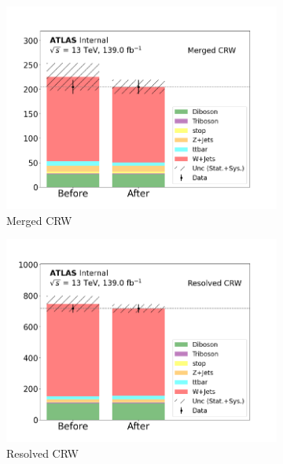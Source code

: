 \begin{figure}[h]
  \centering
  \begin{subfigure}{0.45\textwidth}
    \includegraphics[width=\textwidth]{Figures/8/CRW_Merged_before_after.pdf}
    \caption{Merged CRW}\label{fig:before_after_CRW_merged}
  \end{subfigure} \hspace{1em}
  \begin{subfigure}{0.45\textwidth}
    \includegraphics[width=\textwidth]{Figures/8/CRW_Resolved_before_after.pdf}
    \caption{Resolved CRW}\label{fig:before_after_CRW_resolved}
  \end{subfigure} \vspace{1em}
  \begin{subfigure}{0.45\textwidth}

\end{subfigure}
\end{figure}

